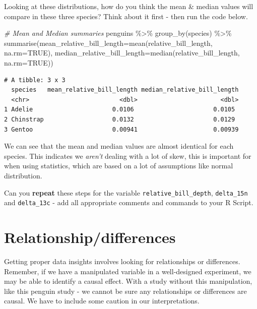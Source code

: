 \documentclass[
]{book}
\makeatletter
\newenvironment{Shaded}{\begin{snugshade}}{\end{snugshade}}
\newcommand{\AttributeTok}[1]{\textcolor[rgb]{0.77,0.63,0.00}{#1}}
\newcommand{\CommentTok}[1]{\textcolor[rgb]{0.56,0.35,0.01}{\textit{#1}}}
\newcommand{\ConstantTok}[1]{\textcolor[rgb]{0.00,0.00,0.00}{#1}}
\newcommand{\FunctionTok}[1]{\textcolor[rgb]{0.00,0.00,0.00}{#1}}
\newcommand{\NormalTok}[1]{#1}
\newcommand{\SpecialCharTok}[1]{\textcolor[rgb]{0.00,0.00,0.00}{#1}}
\newenvironment{kframe}{%
\medskip{}
\setlength{\fboxsep}{.8em}
 \def\at@end@of@kframe{}%
 \ifinner\ifhmode%
  \def\at@end@of@kframe{\end{minipage}}%
  \begin{minipage}{\columnwidth}%
 \fi\fi%
 \def\FrameCommand##1{\hskip\@totalleftmargin \hskip-\fboxsep
 \colorbox{shadecolor}{##1}\hskip-\fboxsep
     \hskip-\linewidth \hskip-\@totalleftmargin \hskip\columnwidth}%
 \MakeFramed {\advance\hsize-\width
   \@totalleftmargin\z@ \linewidth\hsize
   \@setminipage}}%
 {\par\unskip\endMakeFramed%
 \at@end@of@kframe}
\newenvironment{block}[1]
  {
  \begin{itemize}
  \renewcommand{\labelitemi}{
    \raisebox{-.7\height}[0pt][0pt]{
      {\setkeys{Gin}{width=3em,keepaspectratio}\texttt{[image: images/\#1]}}
    }
  }
  \setlength{\fboxsep}{1em}
  \begin{kframe}
  \item
  }
  {
  \end{kframe}
  \end{itemize}
  }
\newenvironment{rmdquestion}
  {\begin{block}{question}}
  {\end{block}}
\makeatother
\begin{document}
\begin{rmdquestion}
Looking at these distributions, how do you think the mean \& median
values will compare in these three species? Think about it first - then
run the code below.
\end{rmdquestion}

\begin{Shaded}
\begin{Highlighting}[]
\CommentTok{\# Mean and Median summaries}
\NormalTok{penguins }\SpecialCharTok{\%\textgreater{}\%} 
  \FunctionTok{group\_by}\NormalTok{(species) }\SpecialCharTok{\%\textgreater{}\%} 
  \FunctionTok{summarise}\NormalTok{(}\AttributeTok{mean\_relative\_bill\_length=}\FunctionTok{mean}\NormalTok{(relative\_bill\_length, }\AttributeTok{na.rm=}\ConstantTok{TRUE}\NormalTok{),}
            \AttributeTok{median\_relative\_bill\_length=}\FunctionTok{median}\NormalTok{(relative\_bill\_length, }\AttributeTok{na.rm=}\ConstantTok{TRUE}\NormalTok{))}
\end{Highlighting}
\end{Shaded}

\begin{verbatim}
# A tibble: 3 x 3
  species   mean_relative_bill_length median_relative_bill_length
  <chr>                         <dbl>                       <dbl>
1 Adelie                      0.0106                      0.0105 
2 Chinstrap                   0.0132                      0.0129 
3 Gentoo                      0.00941                     0.00939
\end{verbatim}

We can see that the mean and median values are almost identical for each species. This indicates we \emph{aren't} dealing with a lot of skew, this is important for when using statistics, which are based on a lot of assumptions like normal distribution.

\begin{rmdquestion}
Can you \textbf{repeat} these steps for the variable
\texttt{relative\_bill\_depth}, \texttt{delta\_15n} and
\texttt{delta\_13c} - add all appropriate comments and commands to your
R Script.
\end{rmdquestion}

\hypertarget{relationshipdifferences}{%
\section{Relationship/differences}\label{relationshipdifferences}}

Getting proper data insights involves looking for relationships or differences.
Remember, if we have a manipulated variable in a well-designed experiment, we may be able to identify a causal effect. With a study without this manipulation, like this penguin study - we cannot be sure any relationships or differences are causal. We have to include some caution in our interpretations.
\end{document}
